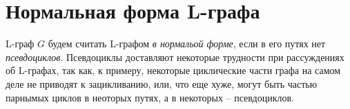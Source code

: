 \section{Нормальная форма L-графа}

L-граф $G$ будем считать L-графом \emph{в нормальой форме}, если в его путях нет \emph{псевдоциклов}.
Псевдоциклы доставляют некоторые трудности при рассуждениях об L-графах, так как, к примеру,
некоторые циклические части графа на самом деле не приводят к зацикливанию, или, что еще хуже, могут
быть частью парнымых циклов в неоторых путях, а в некоторых -- псевдоциклов. 

\clearpage